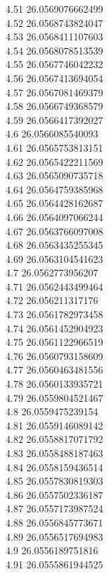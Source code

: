 {4.51	26.0569076662499\\
4.52	26.0568743824047\\
4.53	26.0568411107603\\
4.54	26.0568078513539\\
4.55	26.0567746042232\\
4.56	26.0567413694054\\
4.57	26.0567081469379\\
4.58	26.0566749368579\\
4.59	26.0566417392027\\
4.6	26.0566085540093\\
4.61	26.0565753813151\\
4.62	26.0565422211569\\
4.63	26.0565090735718\\
4.64	26.0564759385968\\
4.65	26.0564428162687\\
4.66	26.0564097066244\\
4.67	26.0563766097008\\
4.68	26.0563435255345\\
4.69	26.0563104541623\\
4.7	26.0562773956207\\
4.71	26.0562443499464\\
4.72	26.056211317176\\
4.73	26.0561782973458\\
4.74	26.0561452904923\\
4.75	26.0561122966519\\
4.76	26.0560793158609\\
4.77	26.0560463481556\\
4.78	26.0560133935721\\
4.79	26.0559804521467\\
4.8	26.0559475239154\\
4.81	26.0559146089142\\
4.82	26.0558817071792\\
4.83	26.0558488187463\\
4.84	26.0558159436514\\
4.85	26.0557830819303\\
4.86	26.0557502336187\\
4.87	26.0557173987524\\
4.88	26.0556845773671\\
4.89	26.0556517694983\\
4.9	26.0556189751816\\
4.91	26.0555861944525\\
}

